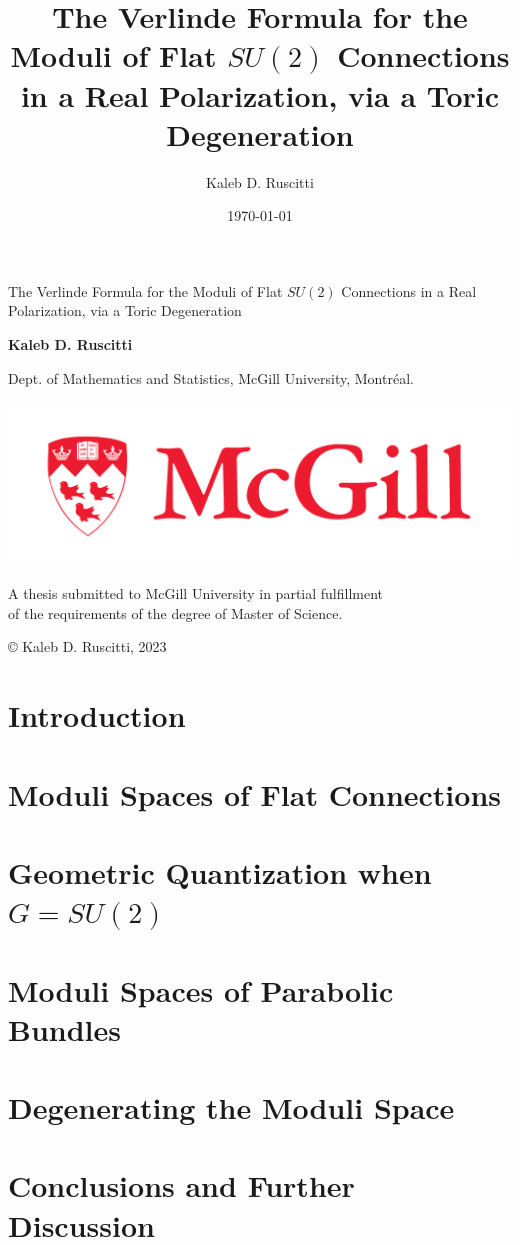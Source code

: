 \documentclass[]{report}
\title{The Verlinde Formula for the Moduli of Flat $SU(2)$ Connections in a Real Polarization, via a Toric Degeneration}
\date{\today}
\author{Kaleb D. Ruscitti}
\numberwithin{theorem}{chapter}
\begin{document}
	
\begin{titlepage}
	\begin{center}
		\vspace*{1cm}
		
		{\Large The Verlinde Formula for the Moduli of Flat $SU(2)$ Connections in a Real Polarization, via a Toric Degeneration}
		
		\vspace{2cm}
		\textbf{Kaleb D. Ruscitti}
		
		\vspace{0.5 cm}
		Dept. of Mathematics and Statistics, McGill University, Montréal.
		
		\vfill
		
		\includegraphics{mcgill_sig_red.png}
	
		
		A thesis submitted to McGill University in partial fulfillment \\
		 of the requirements of the degree of Master of Science.
		
		\vspace{0.5 cm}
		{\footnotesize © Kaleb D. Ruscitti, 2023}
	\end{center}
\end{titlepage}
\tableofcontents



\chapter{Introduction}
\label{s:intro}

\chapter{Moduli Spaces of Flat Connections}
\label{s:background}

\chapter{Geometric Quantization when $G=SU(2)$}
\label{s:jeffreyweitsman}

\chapter{Moduli Spaces of Parabolic Bundles}
\label{s:mastermoduli}

\chapter{Degenerating the Moduli Space}
\label{s:degeneration}


\chapter{Conclusions and Further Discussion}
\label{s:conclusions}


\pagebreak
\printbibliography
\end{document}
